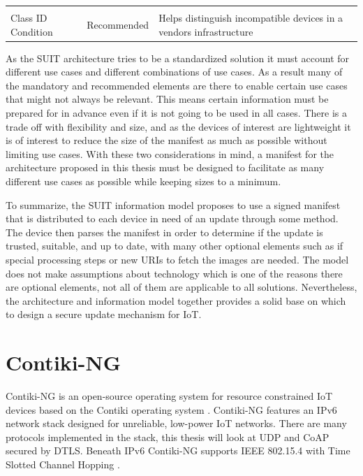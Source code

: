 \documentclass[0-thesis.tex]{subfiles}
\begin{document}
\begin{longtable}[]{@{}lll@{}}
\begin{minipage}[t]{0.42\columnwidth}
    \end{minipage}\tabularnewline
    \begin{minipage}[t]{0.23\columnwidth}\raggedright\strut
    Class ID Condition\strut
    \end{minipage} & \begin{minipage}[t]{0.26\columnwidth}\raggedright\strut
    Recommended\strut
    \end{minipage} & \begin{minipage}[t]{0.42\columnwidth}\raggedright\strut
    Helps distinguish incompatible devices in a vendors infrastructure\strut
    \end{minipage}\tabularnewline
    \bottomrule
\end{longtable}

As the SUIT architecture tries to be a standardized solution it must account for different
use cases and different combinations of use cases. As a result many of the mandatory and
recommended elements are there to enable certain use cases that might not always be
relevant. This means certain information must be prepared for in advance even if it is not
going to be used in all cases. There is a trade off with flexibility and size, and as the
devices of interest are lightweight it is of interest to reduce the size of the manifest
as much as possible without limiting use cases. With these two considerations in mind, a
manifest for the architecture proposed in this thesis must be designed to facilitate as
many different use cases as possible while keeping sizes to a minimum.

To summarize, the SUIT information model proposes to use a signed manifest that is
distributed to each device in need of an update through some method. The device then
parses the manifest in order to determine if the update is trusted, suitable, and up to
date, with many other optional elements such as if special processing steps or new URIs to
fetch the images are needed. The model does not make assumptions about technology which is
one of the reasons there are optional elements, not all of them are applicable to all
solutions. Nevertheless, the architecture and information model together provides a solid
base on which to design a secure update mechanism for IoT.

\section{Contiki-NG}
\label{sec:contiki-ng}
Contiki-NG is an open-source operating system for resource constrained IoT devices based
on the Contiki operating system \parencite{contiki-ng-github, contiki-github}. Contiki-NG
features an IPv6 network stack designed for unreliable, low-power IoT networks. There are
many protocols implemented in the stack, this thesis will look at UDP and CoAP secured by
DTLS. Beneath IPv6 Contiki-NG supports IEEE 802.15.4 with Time Slotted Channel Hopping
\parencite{ieee-802.15.4}.
\end{document}
